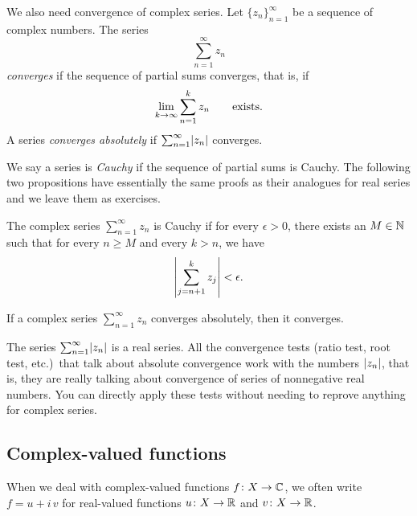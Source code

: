 We also need convergence of complex series.  Let $\{ z_n \}_{n=1}^\infty$ be a
sequence of complex
numbers. The series
\begin{equation*}
\sum_{n=1}^\infty z_n
\end{equation*}
\emph{converges} if the sequence of partial sums converges, that is, if
\begin{equation*}
\lim_{k\to\infty} \sum_{n=1}^k z_n \qquad \text{exists.}
\avoidbreak
\end{equation*}
A series \emph{converges absolutely}
if $\sum_{n=1}^\infty \lvert {z_n} \rvert$ converges.

We say a series
is \emph{Cauchy}
if the sequence of partial sums is Cauchy.  The following two
propositions have essentially the same proofs
as their analogues for real series and we
leave them as exercises.

\begin{prop} \label{prop:cachysercomplex}
The complex series $\sum_{n=1}^\infty z_n$ is Cauchy if for every $\epsilon > 0$, 
there exists an $M \in {\mathbb{N}}$ such that for every $n \geq M$
and every $k > n$, we have
\begin{equation*}
\left\lvert { \sum_{j={n+1}}^k z_j } \right\rvert
< \epsilon .
\end{equation*}
\end{prop}

\begin{prop} \label{prop:absconvmeansconv}
If a complex series $\sum_{n=1}^\infty z_n$ converges absolutely, then it converges.
\end{prop}

The series $\sum_{n=1}^\infty \lvert {z_n} \rvert$ is a real series.  All the
convergence tests (ratio test, root test, etc.)\ that talk about
absolute convergence work with the numbers $\lvert {z_n} \rvert$, that is, they
are really talking about convergence of series of nonnegative real
numbers.
You can directly apply these tests
without needing to reprove anything for complex series.

\subsection{Complex-valued functions}

When we deal with complex-valued functions
$f \colon X \to {\mathbb{C}}$, we often write
$f = u+i\,v$ for real-valued functions $u \colon X \to {\mathbb{R}}$ and $v \colon X \to
{\mathbb{R}}$.

